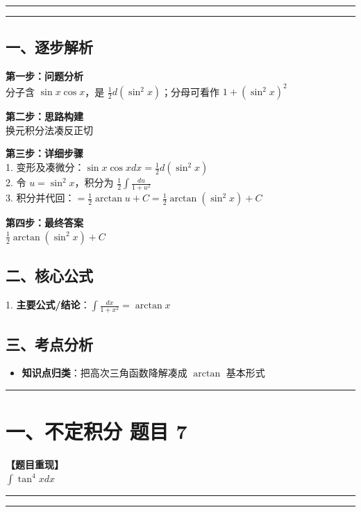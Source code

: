 ﻿\documentclass[12pt, a4paper]{ctexart}
\newcommand{\TopSeparator}{
    \par\noindent\rule{\textwidth}{1.5pt}\vspace{0.5em}
}
\newcommand{\AnalysisSeparator}{
    \par\noindent\rule{\textwidth}{0.5pt}\vspace{0.2em}\hrule\vspace{0.5em}
}
\newenvironment{RedAnalysis}{
    \par
    \color{red} 
}{
    \par
    \color{black} 
}
\begin{document}
\AnalysisSeparator

\begin{RedAnalysis}

	\subsection*{一、逐步解析}

	\textbf{第一步：问题分析} \\
	分子含 $\sin x \cos x$，是 $\frac{1}{2} d(\sin^2 x)$；分母可看作 $1+(\sin^2 x)^2$

	\textbf{第二步：思路构建} \\
	换元积分法凑反正切

	\textbf{第三步：详细步骤} \\
	1. 变形及凑微分：$\sin x \cos x dx = \frac{1}{2} d(\sin^2 x)$ \\ 
	2. 令 $u=\sin^2 x$，积分为 $\frac{1}{2} \int \frac{du}{1+u^2}$ \\ 
	3. 积分并代回：$ = \frac{1}{2} \arctan u + C = \frac{1}{2} \arctan(\sin^2 x) + C$

	\textbf{第四步：最终答案} \\
	$\frac{1}{2} \arctan(\sin^2 x) + C$

	\subsection*{二、核心公式}
	1. \textbf{主要公式/结论}：$\int \frac{dx}{1+x^2} = \arctan x$

	\subsection*{三、考点分析}
	\begin{itemize}
		\item \textbf{知识点归类}：把高次三角函数降解凑成 $ \arctan $ 基本形式
	\end{itemize}

\end{RedAnalysis}

\vspace{2em}

\TopSeparator
\section*{一、不定积分 题目 7}

\textbf{【题目重现】} \\
$\int \tan^4 x dx$

\AnalysisSeparator
\end{document}
